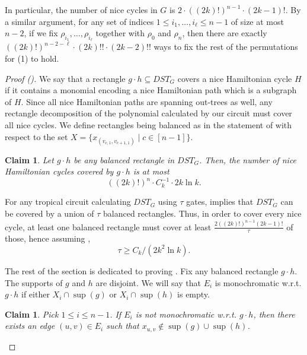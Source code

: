\documentclass[11pt,a4paper]{article}
\newtheorem{claim}[lemma]{Claim}
\begin{document}
    In particular, the number of nice cycles in $G$ is $2 \cdot ((2k)!)^{n-1} \cdot (2k - 1)!$. By a similar argument, for any set of indices $1 \leq i_1, \dots, i_\ell \leq n - 1$ of size at most $n - 2$, if we fix $\rho_{i_1}, \dots, \rho_{i_\ell}$ together with $\rho_0$ and $\rho_n$, then there are exactly
    $
        ((2k)!)^{n - 2 - \ell} \cdot (2k)!! \cdot (2k - 2)!!
    $
    ways to fix the rest of the permutations for (1) to hold.
    \newline




\begin{proof}[Proof ()]

    We say that a rectangle $g \cdot h \subseteq DST_G$ covers a nice Hamiltonian cycle $H$ if it contains a monomial encoding a nice Hamiltonian path which is a subgraph of $H$. Since all nice Hamiltonian paths are spanning out-trees as well, any rectangle decomposition of the polynomial calculated by our circuit must cover all nice cycles. We define rectangles being balanced as in the statement of  with respect to the set $X = \{ x_{(v_{c, 1}, v_{c + 1, 1})} \mid c \in [n - 1] \}$.
    
    \begin{claim}\label{clm:dst_rect_bound}
        Let $g \cdot h$ be any balanced rectangle in $DST_G$. Then, the number of nice Hamiltonian cycles covered by $g \cdot h$ is at most
        $$
            ((2k)!)^n \cdot C_k^{-1} \cdot 2k \ln k.
        $$
    \end{claim}

    For any tropical circuit calculating $DST_G$ using $\tau$ gates,  implies that $DST_G$ can be covered by a union of $\tau$ balanced rectangles. Thus, in order to cover every nice cycle, at least one balanced rectangle must cover at least $\frac{2 ((2k)!)^{n - 1} (2k - 1)!}{\tau}$ of those, hence assuming ,
    $$
        \tau \geq C_k / (2k^2 \ln k).
    $$    
    
    The rest of the section is dedicated to proving .
    Fix any balanced rectangle $g \cdot h$. The supports of $g$ and $h$ are disjoint. We will say that $E_i$ is monochromatic w.r.t. $g \cdot h$ if either $X_i \cap \sup(g)$ or $X_i \cap \sup(h)$ is empty.

    \begin{claim}\label{clm:dst_rect_colorful}
        Pick $1 \leq i \leq n - 1$. If $E_i$ is not monochromatic w.r.t. $g \cdot h$, then there exists an edge $(u, v) \in E_i$ such that $x_{u, v} \not\in \sup(g) \cup \sup(h)$.
    \end{claim}


\end{proof}
\end{document}
